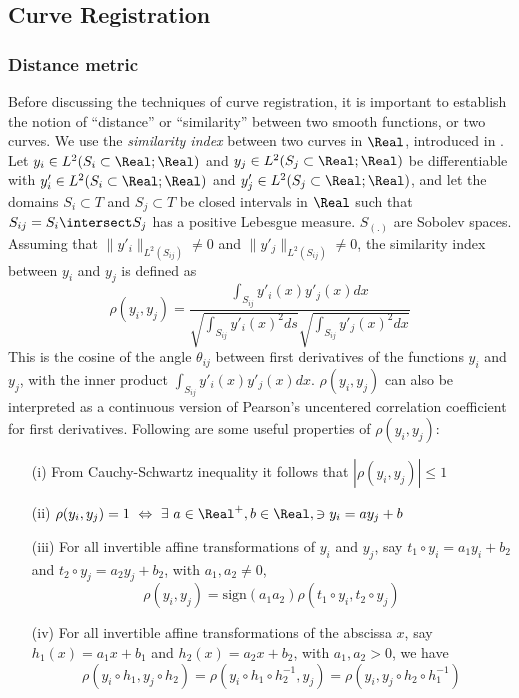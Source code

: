 \subsection{Curve Registration} \label{Ch3_Regist}
\subsubsection{Distance metric}
Before discussing the techniques of curve registration, it is important to establish the notion of ``distance'' or ``similarity'' between two smooth functions, or two curves. We use the {\emph{similarity index}} between two curves in $\Real$, introduced in \cite{Sangalli_etal_2009_JASA}. Let $y_i \in L^2(S_i \subset \Real; \Real)$ and $y_j \in L^2(S_j \subset \Real; \Real)$ be differentiable with $y'_i \in L^2(S_i \subset \Real; \Real)$ and $y'_j \in L^2(S_j \subset \Real; \Real)$, and let the domains $S_i \subset T$ and $S_j  \subset T$ be closed intervals in $\Real$ such that $S_{ij} = S_i \intersect S_j$ has a positive Lebesgue measure. $S_{(.)}$ are Sobolev spaces. Assuming that $\|y'_i\|_{L^2(S_{ij})} \ne 0$ and $\|y'_j\|_{L^2(S_{ij})} \ne 0$, the similarity index between $y_i$ and $y_j$ is defined as
\begin{equation}
\rho(y_i, y_j) = \frac{\int _{S_{ij}}y'_i(x)y'_j(x) dx}{\sqrt{\int _{S_{ij}}y'_i(x)^2 ds}\sqrt{ \int _{S_{ij}} y'_j(x)^2 dx}}
\label{eq:3_similarity}
\end{equation}
This is the cosine of the angle $\theta_{ij}$ between first derivatives of the functions $y_i$ and $y_j$, with the inner product $\int _{S_{ij}}y'_i(x)y'_j(x) dx$.  $\rho(y_i, y_j)$ can also be interpreted as a continuous version of Pearson’s uncentered correlation coefficient for first derivatives. Following are some useful properties of $\rho(y_i, y_j)$:
\begin{enumerate}
\item[(i)] From Cauchy-Schwartz inequality it follows that $|\rho(y_i, y_j)| \leq 1$
\item[(ii)] $\rho(y_i, y_j) = 1 \ \Leftrightarrow \ \exists \ a \in \Real^{+}, b \in \Real, \ni y_i = ay_j + b $
\item[(iii)] For all invertible affine transformations of $y_i$ and $y_j$, say $t_1 \circ y_i = a_1y_i + b_2$ and $t_2 \circ y_j = a_2y_j + b_2$, with $a_1, a_2 \ne 0$, 
\[ \rho(y_i, y_j) = \text{sign}(a_1 a_2)\rho(t_1 \circ y_i, t_2 \circ y_j)\]
\item[(iv)] For all invertible affine transformations of the abscissa $x$, say $h_1(x) = a_1 x + b_1$ and $h_2(x) = a_2 x + b_2$, with $a_1, a_2 > 0$, we have
\[ \rho(y_i \circ h_1, y_j \circ h_2) = \rho(y_i \circ h_1 \circ h_2^{-1}, y_j) = \rho(y_i , y_j \circ h_2 \circ h_1^{-1}) \]
\end{enumerate}

